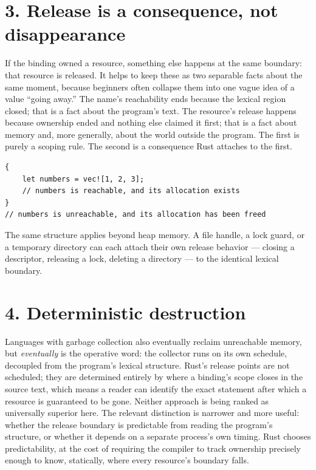 \documentclass[11pt]{book}
\begin{document}
\section*{3. Release is a consequence, not disappearance}

If the binding owned a resource, something else happens at the same boundary: that resource is released. It helps to keep these as two separable facts about the same moment, because beginners often collapse them into one vague idea of a value ``going away.'' The name's reachability ends because the lexical region closed; that is a fact about the program's text. The resource's release happens because ownership ended and nothing else claimed it first; that is a fact about memory and, more generally, about the world outside the program. The first is purely a scoping rule. The second is a consequence Rust attaches to the first.

\begin{lstlisting}
{
    let numbers = vec![1, 2, 3];
    // numbers is reachable, and its allocation exists
}
// numbers is unreachable, and its allocation has been freed
\end{lstlisting}

The same structure applies beyond heap memory. A file handle, a lock guard, or a temporary directory can each attach their own release behavior --- closing a descriptor, releasing a lock, deleting a directory --- to the identical lexical boundary.

\section*{4. Deterministic destruction}

Languages with garbage collection also eventually reclaim unreachable memory, but \emph{eventually} is the operative word: the collector runs on its own schedule, decoupled from the program's lexical structure. Rust's release points are not scheduled; they are determined entirely by where a binding's scope closes in the source text, which means a reader can identify the exact statement after which a resource is guaranteed to be gone. Neither approach is being ranked as universally superior here. The relevant distinction is narrower and more useful: whether the release boundary is predictable from reading the program's structure, or whether it depends on a separate process's own timing. Rust chooses predictability, at the cost of requiring the compiler to track ownership precisely enough to know, statically, where every resource's boundary falls.
\end{document}
